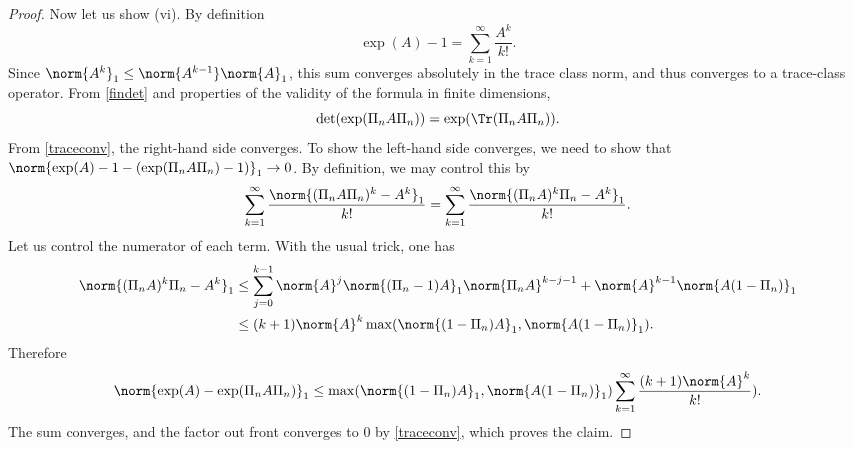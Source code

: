 \documentclass[12pt]{amsart}
\begin{document}
\begin{proof}
Now let us show (vi). By definition
\[\exp(A)-1 = \sum_{k=1}^{\infty} \frac{A^k}{k!}.\] Since $\norm{A^k}_1 \leq \norm{A^{k-1}}\norm{A}_1$, this sum converges absolutely in the trace class norm, and thus converges to a trace-class operator. From \cref{findet} and properties of the validity of the formula in finite dimensions,
\[\det(\exp(\Pi_nA\Pi_n)) = \exp(\Tr(\Pi_nA\Pi_n)).\] From \cref{traceconv}, the right-hand side converges. To show the left-hand side converges, we need to show that $\norm{\exp(A)-1-(\exp(\Pi_nA\Pi_n)-1)}_1 \to 0$. By definition, we may control this by
\[\sum_{k=1}^{\infty} \frac{\norm{(\Pi_nA\Pi_n)^k-A^k}_1}{k!} = \sum_{k=1}^{\infty} \frac{\norm{(\Pi_nA)^k\Pi_n-A^k}_1}{k!}.\] Let us control the numerator of each term. With the usual trick, one has
\begin{align*}
\norm{(\Pi_nA)^k\Pi_n-A^k}_1 &\leq \sum_{j=0}^{k-1} \norm{A}^j\norm{(\Pi_n-1)A}_1\norm{\Pi_nA}^{k-j-1} + \norm{A}^{k-1}\norm{A(1-\Pi_n)}_1\\
&\leq (k+1)\norm{A}^k\max(\norm{(1-\Pi_n)A}_1,\norm{A(1-\Pi_n)}_1).\end{align*}
Therefore
\[\norm{\exp(A)-\exp(\Pi_nA\Pi_n)}_1 \leq \max(\norm{(1-\Pi_n)A}_1,\norm{A(1-\Pi_n)}_1)\sum_{k=1}^{\infty} \frac{(k+1)\norm{A}^k}{k!}).\]The sum converges, and the factor out front converges to $0$ by \cref{traceconv}, which proves the claim.


\end{proof}
\end{document}
